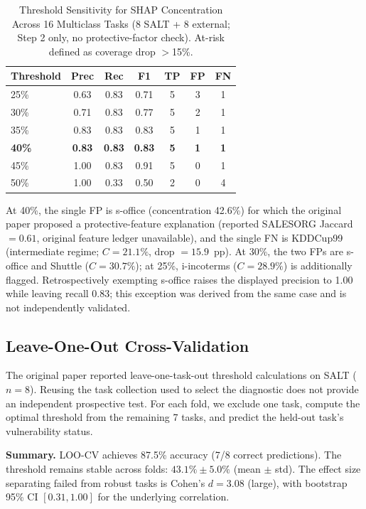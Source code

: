 \documentclass[accepted]{uai2026} %
\begin{document}
\begin{table}[htbp]
\centering
\caption{Threshold Sensitivity for SHAP Concentration Across 16 Multiclass Tasks (8 SALT + 8 external; Step 2 only, no protective-factor check). At-risk defined as coverage drop $>$15\%.}\label{tab:threshold_sensitivity}
\small
\begin{tabular}{lcccccc}
\toprule
Threshold & Prec & Rec & F1 & TP & FP & FN \\
\midrule
25\% & 0.63 & 0.83 & 0.71 & 5 & 3 & 1 \\
30\% & 0.71 & 0.83 & 0.77 & 5 & 2 & 1 \\
35\% & 0.83 & 0.83 & 0.83 & 5 & 1 & 1 \\
\textbf{40\%} & \textbf{0.83} & \textbf{0.83} & \textbf{0.83} & \textbf{5} & \textbf{1} & \textbf{1} \\
45\% & 1.00 & 0.83 & 0.91 & 5 & 0 & 1 \\
50\% & 1.00 & 0.33 & 0.50 & 2 & 0 & 4 \\
\bottomrule
\end{tabular}


\raggedright
\footnotesize
At 40\%, the single FP is s-office (concentration 42.6\%) for which the original paper proposed a protective-feature explanation (reported SALESORG Jaccard $=0.61$, original feature ledger unavailable), and the single FN is KDDCup99 (intermediate regime; $C=21.1\%$, drop $=15.9$~pp). At 30\%, the two FPs are s-office and Shuttle ($C=30.7\%$); at 25\%, i-incoterms ($C=28.9\%$) is additionally flagged. Retrospectively exempting s-office raises the displayed precision to 1.00 while leaving recall 0.83; this exception was derived from the same case and is not independently validated.
\end{table}

\subsection{Leave-One-Out Cross-Validation}\label{app:loocv}

The original paper reported leave-one-task-out threshold calculations on SALT ($n=8$). Reusing the task collection used to select the diagnostic does not provide an independent prospective test. For each fold, we exclude one task, compute the optimal threshold from the remaining 7 tasks, and predict the held-out task's vulnerability status.

\textbf{Summary.} LOO-CV achieves 87.5\% accuracy (7/8 correct predictions). The threshold remains stable across folds: $43.1\% \pm 5.0\%$ (mean $\pm$ std). The effect size separating failed from robust tasks is Cohen's $d = 3.08$ (large), with bootstrap 95\% CI $[0.31, 1.00]$ for the underlying correlation.
\end{document}
